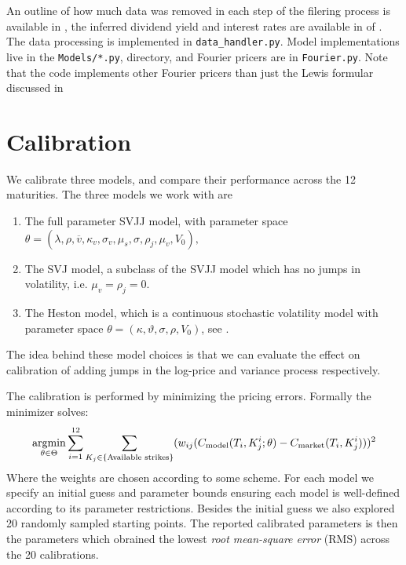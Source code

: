 An outline of how much data was removed in each step of the filering process is available in
, the inferred dividend yield and interest rates are available in
 of .
The data processing is implemented in \verb|data_handler.py|. Model implementations live in the
\verb|Models/*.py|, directory, and Fourier pricers are in \verb|Fourier.py|. Note that the code
implements other Fourier pricers than just the Lewis formular discussed in 

\section{Calibration}
\label{sec:calibration}
We calibrate three models, and compare their performance across the 12 maturities. The three models
we work with are
\begin{enumerate}
\item The full parameter SVJJ model, with parameter space $\theta =
  (\lambda,\rho,\overline{v},\kappa_v,\sigma_v, \mu_s,\sigma,\rho_j,\mu_v,V_0),$
\item The SVJ model, a subclass of the SVJJ model which has no jumps in volatility, i.e. $\mu_v =
  \rho_j = 0$.
\item The Heston model, which is a continuous stochastic volatility model with parameter space
  $\theta= (\kappa, \vartheta, \sigma, \rho, V_0)$, see \parencite{Heston1993}.
\end{enumerate}
The idea behind these model choices is that we can evaluate the effect on calibration of adding
jumps in the log-price and variance process respectively.

The calibration is performed by minimizing the pricing errors. Formally the minimizer solves:
\[
  \underset{\theta \in \Theta}{\operatorname{argmin}} 
  \sum_{i=1}^{12} \sum_{K_j \in \{ \text{Available strikes} \}}
  (w_{ij}(C_{\mathrm{model}}(T_i,K_j^i;\theta) - C_{\mathrm{market}}(T_i,K_j^i)))^2 
\]
Where the weights are chosen according to some scheme. For each model we specify an initial guess
and parameter bounds ensuring each model is well-defined according to its parameter restrictions.
Besides the initial guess we also explored 20 randomly sampled starting points. The reported
calibrated parameters is then the parameters which obrained the lowest \emph{root mean-square
error} (RMS) across the 20 calibrations.

